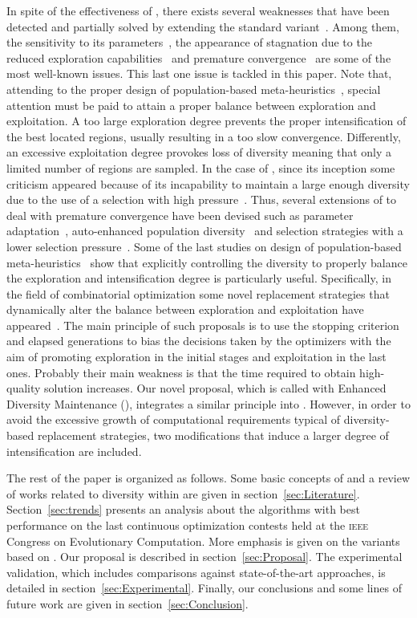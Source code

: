 In spite of the effectiveness of \DE{}, there exists several weaknesses that have been detected and partially
solved by extending the standard variant~\cite{das2011differential}.
%
Among them, the sensitivity to its parameters~\cite{zhang2009jade}, the appearance of stagnation due to the reduced exploration 
capabilities~\cite{sa2008exploration,lampinen2000stagnation} and premature convergence~\cite{zaharie2003control} are some of the most well-known
issues.
%
This last one issue is tackled in this paper.
%
Note that, attending to the proper design of population-based meta-heuristics~\cite{Talbi:09}, special attention must be
paid to attain a proper balance between exploration and exploitation.
%
A too large exploration degree prevents the proper intensification of the best located regions, usually resulting in a
too slow convergence.
%
Differently, an excessive exploitation degree provokes loss of diversity meaning that only a limited number of regions are sampled.
%
In the case of \DE{}, since its inception some criticism appeared because of its incapability to maintain a large
enough diversity due to the use of a selection with high pressure~\cite{sa2008exploration}.
%
Thus, several extensions of \DE{} to deal with premature convergence have been devised 
such as parameter adaptation~\cite{zaharie2003control}, 
auto-enhanced population diversity~\cite{yang2015differential} and selection strategies 
with a lower selection pressure~\cite{sa2008exploration}.
%
Some of the last studies on design of population-based meta-heuristics~\cite{Crepinsek:13} show that 
explicitly controlling the diversity to properly balance the exploration and intensification degree
is particularly useful.
%
Specifically, in the field of combinatorial optimization some novel replacement strategies that dynamically alter 
the balance between exploration and exploitation 
have appeared~\cite{segura2016novel}.
%
The main principle of such proposals is to use the stopping criterion and elapsed generations to bias the decisions 
taken by the optimizers with the aim of promoting exploration in the initial stages and exploitation in the last ones.
%
Probably their main weakness is that the time required to obtain high-quality solution increases.
%
Our novel proposal, which is called \DE{} with Enhanced Diversity Maintenance (\DEEDM{}), integrates a similar principle into \DE{}.
%
However, in order to avoid the excessive growth of computational requirements typical of diversity-based replacement strategies, 
two modifications that induce a larger degree of intensification are included.

The rest of the paper is organized as follows.
%
Some basic concepts of \DE{} and a review of works related to diversity within \DE{} are given in section~\ref{sec:Literature}.
%
Section~\ref{sec:trends} presents an analysis about the algorithms with best performance on the last continuous optimization 
contests held at the \textsc{ieee} Congress on Evolutionary Computation.
%
More emphasis is given on the variants based on \DE{}.
%
Our proposal is described in section~\ref{sec:Proposal}.
%
The experimental validation, which includes comparisons against state-of-the-art approaches, is detailed in section~\ref{sec:Experimental}. 
%
Finally, our conclusions and some lines of future work are given in section~\ref{sec:Conclusion}.
